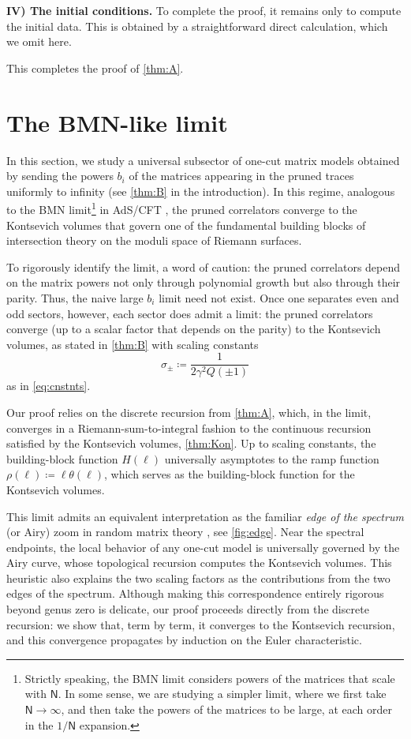 \documentclass[a4paper,11pt,english]{article}
\theoremstyle{plain}
\theoremstyle{definition}
\theoremstyle{plain}
\newcommand{\ms}[1]{\mathsf{#1}}
\begin{document}
{\bfseries IV) The initial conditions.} To complete the proof, it remains only to compute the initial data. This is obtained by a straightforward direct calculation, which we omit here.

This completes the proof of \cref{thm:A}.

\section{The BMN-like limit}
\label{sec:BMN}

In this section, we study a universal subsector of one-cut matrix models obtained by sending the powers $b_i$ of the matrices appearing in the pruned traces uniformly to infinity (see \cref{thm:B} in the introduction). In this regime, analogous to the BMN limit\footnote{
    Strictly speaking, the BMN limit considers powers of the matrices that scale with $\ms{N}$. In some sense, we are studying a simpler limit, where we first take $\ms{N} \rightarrow \infty$, and then take the powers of the matrices to be large, at each order in the $1/\ms{N}$ expansion.
} in AdS/CFT \cite{BMN02}, the pruned correlators converge to the Kontsevich volumes that govern one of the fundamental building blocks of intersection theory on the moduli space of Riemann surfaces.

To rigorously identify the limit, a word of caution: the pruned correlators depend on the matrix powers not only through polynomial growth but also through their parity. Thus, the naive large $b_i$ limit need not exist. Once one separates even and odd sectors, however, each sector does admit a limit: the pruned correlators converge (up to a scalar factor that depends on the parity) to the Kontsevich volumes, as stated in \cref{thm:B} with scaling constants
\begin{equation}
    \sigma_{\pm} \coloneqq \frac{1}{2 \gamma^2 Q(\pm 1)}
\end{equation}
as in \cref{eq:cnstnts}.

Our proof relies on the discrete recursion from \cref{thm:A}, which, in the limit, converges in a Riemann-sum-to-integral fashion to the continuous recursion satisfied by the Kontsevich volumes, \cref{thm:Kon}. Up to scaling constants, the building-block function $H(\ell)$ universally asymptotes to the ramp function $\rho(\ell) \coloneqq \ell \theta(\ell)$, which serves as the building-block function for the Kontsevich volumes.

This limit admits an equivalent interpretation as the familiar \emph{edge of the spectrum} (or Airy) zoom in random matrix theory \cite{TW94,Eyn16,BrezinHikamiAiry,BrezinZee}, see \cref{fig:edge}. Near the spectral endpoints, the local behavior of any one-cut model is universally governed by the Airy curve, whose topological recursion computes the Kontsevich volumes. This heuristic also explains the two scaling factors as the contributions from the two edges of the spectrum. Although making this correspondence entirely rigorous beyond genus zero is delicate, our proof proceeds directly from the discrete recursion: we show that, term by term, it converges to the Kontsevich recursion, and this convergence propagates by induction on the Euler characteristic.
\end{document}

